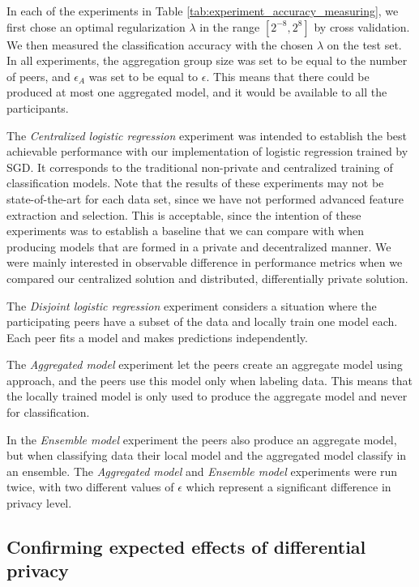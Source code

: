 In each of the experiments in Table \ref{tab:experiment_accuracy_measuring}, we first chose an optimal regularization $\lambda$ in the range $[2^{-8}, 2^8]$ by cross validation. We then measured the classification accuracy with the chosen $\lambda$ on the test set. In all experiments, the aggregation group size was set to be equal to the number of peers, and $\epsilon_{A}$ was set to be equal to $\epsilon$. This means that there could be produced at most one aggregated model, and it would be available to all the participants.

The \textit{Centralized logistic regression} experiment was intended to establish the best achievable performance with our implementation of logistic regression trained by SGD. It corresponds to the traditional non-private and centralized training of classification models. Note that the results of these experiments may not be state-of-the-art for each data set, since we have not performed advanced feature extraction and selection. This is acceptable, since the intention of these experiments was to establish a baseline that we can compare with when producing models that are formed in a private and decentralized manner. We were mainly interested in observable difference in performance metrics when we compared our centralized solution and distributed, differentially private solution.

The \textit{Disjoint logistic regression} experiment considers a situation where the participating peers have a subset of the data and locally train one model each. Each peer fits a model and makes predictions independently.

The \textit{Aggregated model} experiment let the peers create an aggregate model using \cite{pathak2010diffprivhomo} approach, and the peers use this model only when labeling data. This means that the locally trained model is only used to produce the aggregate model and never for classification. 

In the \textit{Ensemble model} experiment the peers also produce an aggregate model, but when classifying data their local model and the aggregated model classify in an ensemble. The \textit{Aggregated model} and \textit{Ensemble model} experiments were run twice, with two different values of $\epsilon$ which represent a significant difference in privacy level.

\subsection{Confirming expected effects of differential privacy}

